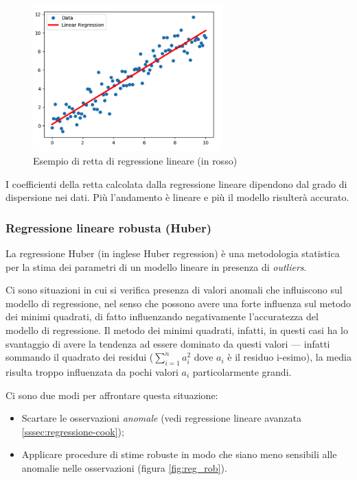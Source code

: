 \begin{figure}[H]
\centering
\includegraphics[width=0.65\textwidth,height=\textheight,keepaspectratio]{img/lin_reg_example.png}
\caption{Esempio di retta di regressione lineare (in rosso)}
\label{fig:reg_lin}
\end{figure}

I coefficienti della retta calcolata dalla regressione lineare dipendono dal grado di dispersione nei dati. Più l'andamento è lineare e più il modello risulterà accurato.

\subsubsection{Regressione lineare robusta (Huber)}\label{sssec:regressione-huber}
La regressione Huber (in inglese Huber regression) è una metodologia statistica per la stima dei parametri di un modello lineare in presenza di \textit{outliers}.

Ci sono situazioni in cui si verifica presenza di valori anomali che influiscono sul modello di regressione, nel senso che possono avere una forte influenza sul metodo dei minimi quadrati, di fatto influenzando negativamente l'accuratezza del modello di regressione. Il metodo dei minimi quadrati, infatti, in questi casi ha lo svantaggio di avere la tendenza ad essere dominato da questi valori — infatti sommando il quadrato dei residui ($\sum_{i=1}^{n} a_i^2$ dove $a_i$ è il residuo i-esimo), la media risulta troppo influenzata da pochi valori $a_i$ particolarmente grandi.

Ci sono due modi per affrontare questa situazione:

\begin{itemize}
  \item Scartare le osservazioni \textit{anomale} (vedi regressione lineare avanzata \ref{sssec:regressione-cook});
  \item Applicare procedure di stime robuste in modo che siano meno sensibili alle anomalie nelle osservazioni (figura \ref{fig:reg_rob}).
\end{itemize}

